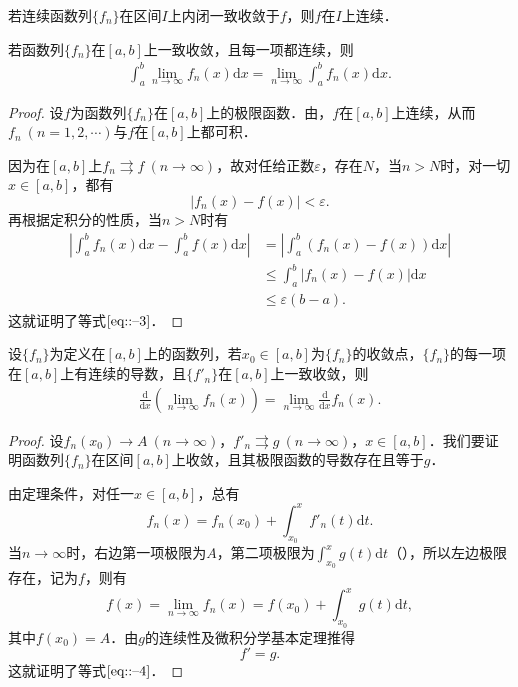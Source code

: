 \documentclass[../../main.tex]{subfiles}
\begin{document}
\begin{corollary}
若连续函数列\(\{f_n\}\)在区间\(I\)上内闭一致收敛于\(f\)，则\(f\)在\(I\)上连续．
\end{corollary}

\begin{theorem}[可积性]\label{theorem:定理13.15648640}
若函数列\(\{f_n\}\)在\([a, b]\)上一致收敛，且每一项都连续，则
\begin{align}
\int_a^b \lim_{n \to \infty} f_n(x) \mathrm{d}x = \lim_{n \to \infty} \int_a^b f_n(x) \mathrm{d}x. \label{eq::--3}
\end{align}
\end{theorem}
\begin{proof}
设\(f\)为函数列\(\{f_n\}\)在\([a, b]\)上的极限函数．由，\(f\)在\([a, b]\)上连续，从而\(f_n \ (n = 1, 2, \cdots)\)与\(f\)在\([a, b]\)上都可积．

因为在\([a, b]\)上\(f_n \rightrightarrows f \ (n \to \infty)\)，故对任给正数\(\varepsilon\)，存在\(N\)，当\(n > N\)时，对一切\(x \in [a, b]\)，都有
\[
|f_n(x) - f(x)| < \varepsilon.
\]
再根据定积分的性质，当\(n > N\)时有
\begin{align*}
\left| \int_a^b f_n(x) \mathrm{d}x - \int_a^b f(x) \mathrm{d}x \right| &= \left| \int_a^b (f_n(x) - f(x)) \mathrm{d}x \right| \\
&\leqslant \int_a^b |f_n(x) - f(x)| \mathrm{d}x \\
&\leqslant \varepsilon(b - a).
\end{align*}
这就证明了等式\(\eqref{eq::--3}\)．

\end{proof}

\begin{theorem}[可微性]\label{theorem:定理13.1154661}
设\(\{f_n\}\)为定义在\([a, b]\)上的函数列，若\(x_0 \in [a, b]\)为\(\{f_n\}\)的收敛点，\(\{f_n\}\)的每一项在\([a, b]\)上有连续的导数，且\(\{f'_n\}\)在\([a, b]\)上一致收敛，则
\begin{align}
\frac{\mathrm{d}}{\mathrm{d}x} \left( \lim_{n \to \infty} f_n(x) \right) = \lim_{n \to \infty} \frac{\mathrm{d}}{\mathrm{d}x} f_n(x). \label{eq::--4}
\end{align}
\end{theorem}
\begin{proof}
设\(f_n(x_0) \to A \ (n \to \infty)\)，\(f'_n \rightrightarrows g \ (n \to \infty)\)，\(x \in [a, b]\)．我们要证明函数列\(\{f_n\}\)在区间\([a, b]\)上收敛，且其极限函数的导数存在且等于\(g\)．

由定理条件，对任一\(x \in [a, b]\)，总有
\[
f_n(x) = f_n(x_0) + \int_{x_0}^x f'_n(t) \mathrm{d}t.
\]
当\(n \to \infty\)时，右边第一项极限为\(A\)，第二项极限为\(\int_{x_0}^x g(t) \mathrm{d}t\)（），所以左边极限存在，记为\(f\)，则有
\[
f(x) = \lim_{n \to \infty} f_n(x) = f(x_0) + \int_{x_0}^x g(t) \mathrm{d}t,
\]
其中\(f(x_0) = A\)．由\(g\)的连续性及微积分学基本定理推得
\[
f' = g.
\]
这就证明了等式\(\eqref{eq::--4}\)．

\end{proof}
\end{document}
